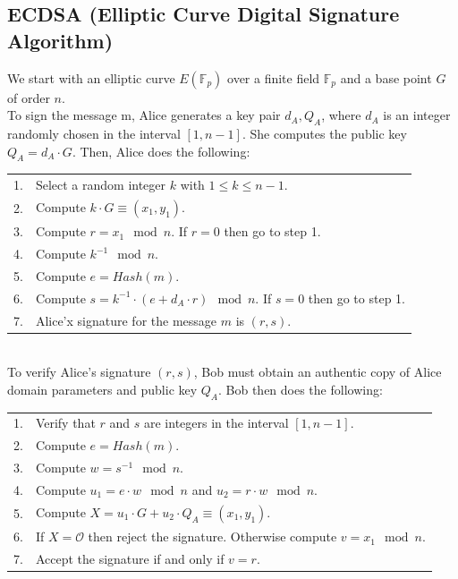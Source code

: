 \subsection{ECDSA (Elliptic Curve Digital Signature Algorithm)}
We start with an elliptic curve $E(\mathbb{F}_p)$ over a finite field $\mathbb{F}_p$ and a base point $G$ of order $n$.\\
To sign the message m, Alice generates a key pair $d_A, Q_A$, where $d_A$ is an integer randomly chosen in the interval $[1,n-1]$.
She computes the public key $Q_A = d_A \cdot G$.
Then, Alice does the following:\\
\begin{tabular}{l l}
	1. 	&	Select a random integer $k$ with $1 \leq k \leq n-1$. \\
	2. 	&	Compute $k \cdot G \equiv (x_1, y_1)$. \\
	3. 	&	Compute $r = x_1 \mod n$. If $r = 0$ then go to step 1.\\
	4. 	&	Compute $k^{-1} \mod n$.\\
	5. 	&	Compute $e = Hash(m)$.\\
	6. 	&	Compute $s=k^{-1} \cdot (e+d_A \cdot r) \mod n$. If $s = 0$ then go to step 1.\\
	7. 	&	Alice'x signature for the message $m$ is $(r, s)$.\\
\end{tabular}\\

To verify Alice's signature $(r, s)$, Bob must obtain an authentic copy of Alice domain parameters
and public key $Q_A$. Bob then does the following:\\
\begin{tabular}{l l}
	1. 	&	Verify that $r$ and $s$ are integers in the interval $[1, n-1]$.\\
	2. 	&	Compute $e = Hash(m)$.\\
	3. 	&	Compute $w = s^{-1} \mod n$.\\
	4. 	&	Compute $u_1 = e \cdot w \mod n$ and $u_2 = r \cdot w \mod n$.\\
	5. 	&	Compute $X = u_1 \cdot G + u_2 \cdot Q_A \equiv (x_1, y_1)$.\\
	6. 	&	If $X = \mathcal{O}$ then reject the signature. Otherwise compute $v = x_1 \mod n$.\\
	7. 	&	Accept the signature if and only if $v = r$.\\
\end{tabular}
